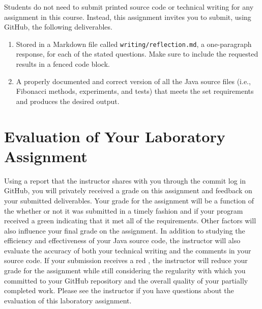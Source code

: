 \documentclass[11pt]{article}
\newcommand{\reflection}{\lstinline{writing/reflection.md}}
\newcommand{\checkmark}{\ding{51}}
\newcommand{\naughtmark}{\ding{55}}
\begin{document}
\noindent Students do not need to submit printed source code or technical
writing for any assignment in this course. Instead, this assignment invites you
to submit, using GitHub, the following deliverables.

\begin{enumerate}

  \setlength{\itemsep}{0in}

\item Stored in a Markdown file called \reflection{}, a one-paragraph response,
  for each of the stated questions. Make sure to include the requested results
  in a fenced code block.

\item A properly documented and correct version of all the Java source files
  (i.e., Fibonacci methods, experiments, and tests) that meets the set
  requirements and produces the desired output.

\end{enumerate}

\section*{Evaluation of Your Laboratory Assignment}

Using a report that the instructor shares with you through the commit log in GitHub, you will privately received a grade
on this assignment and feedback on your submitted deliverables. Your grade for the assignment will be a function of the
whether or not it was submitted in a timely fashion and if your program received a green \checkmark{} indicating that it
met all of the requirements. Other factors will also influence your final grade on the assignment. In addition to
studying the efficiency and effectiveness of your Java source code, the instructor will also evaluate the accuracy of
both your technical writing and the comments in your source code. If your submission receives a red \naughtmark{}, the
instructor will reduce your grade for the assignment while still considering the regularity with which you committed to
your GitHub repository and the overall quality of your partially completed work. Please see the instructor if you have
questions about the evaluation of this laboratory assignment.


\end{document}
